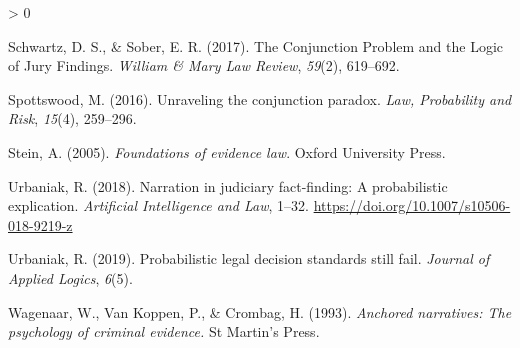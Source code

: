 \documentclass[
  10pt,
  dvipsnames,enabledeprecatedfontcommands]{scrartcl}
\newlength{\cslhangindent}
\newenvironment{CSLReferences}[2] %
 {%
  \setlength{\parindent}{0pt}
  \ifodd #1 \everypar{\setlength{\hangindent}{\cslhangindent}}\ignorespaces\fi
  \ifnum #2 > 0
  \setlength{\parskip}{#2\baselineskip}
  \fi
 }%
 {}
\begin{document}
\begin{CSLReferences}{1}{0}
\leavevmode\hypertarget{ref-schwartz2017ConjunctionProblemLogic}{}%
Schwartz, D. S., \& Sober, E. R. (2017). The {Conjunction Problem} and
the {Logic} of {Jury Findings}. \emph{William \& Mary Law Review},
\emph{59}(2), 619--692.

\leavevmode\hypertarget{ref-spottswood2016}{}%
Spottswood, M. (2016). Unraveling the conjunction paradox. \emph{Law,
Probability and Risk}, \emph{15}(4), 259--296.

\leavevmode\hypertarget{ref-Stein05}{}%
Stein, A. (2005). \emph{Foundations of evidence law}. Oxford University
Press.

\leavevmode\hypertarget{ref-urbaniak2018narration}{}%
Urbaniak, R. (2018). Narration in judiciary fact-finding: A
probabilistic explication. \emph{Artificial Intelligence and Law},
1--32. \url{https://doi.org/10.1007/s10506-018-9219-z}

\leavevmode\hypertarget{ref-Urbaniak2019standards2}{}%
Urbaniak, R. (2019). Probabilistic legal decision standards still fail.
\emph{Journal of Applied Logics}, \emph{6}(5).

\leavevmode\hypertarget{ref-wagenaar1993anchored}{}%
Wagenaar, W., Van Koppen, P., \& Crombag, H. (1993). \emph{Anchored
narratives: The psychology of criminal evidence.} St Martin's Press.

\end{CSLReferences}
\end{document}
